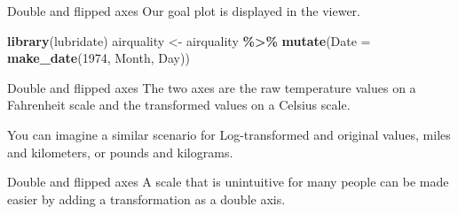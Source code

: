 \documentclass[
  ignorenonframetext,
]{beamer}
\newenvironment{Shaded}{\begin{snugshade}}{\end{snugshade}}
\newcommand{\AttributeTok}[1]{\textcolor[rgb]{0.13,0.29,0.53}{#1}}
\newcommand{\DecValTok}[1]{\textcolor[rgb]{0.00,0.00,0.81}{#1}}
\newcommand{\FunctionTok}[1]{\textcolor[rgb]{0.13,0.29,0.53}{\textbf{#1}}}
\newcommand{\NormalTok}[1]{#1}
\newcommand{\OtherTok}[1]{\textcolor[rgb]{0.56,0.35,0.01}{#1}}
\newcommand{\SpecialCharTok}[1]{\textcolor[rgb]{0.81,0.36,0.00}{\textbf{#1}}}
\begin{document}
\begin{frame}[fragile]{Double and flipped axes}
\label{double-and-flipped-axes-1}
Our goal plot is displayed in the viewer.


\begin{Shaded}
\begin{Highlighting}[]
\FunctionTok{library}\NormalTok{(lubridate)}
\NormalTok{airquality }\OtherTok{\textless{}{-}}\NormalTok{ airquality }\SpecialCharTok{\%\textgreater{}\%}
    \FunctionTok{mutate}\NormalTok{(}\AttributeTok{Date =} \FunctionTok{make\_date}\NormalTok{(}\DecValTok{1974}\NormalTok{, Month, Day))}
\end{Highlighting}
\end{Shaded}
\end{frame}

\begin{frame}{Double and flipped axes}
\label{double-and-flipped-axes-2}
The two axes are the raw temperature values on a Fahrenheit scale and
the transformed values on a Celsius scale.

You can imagine a similar scenario for Log-transformed and original
values, miles and kilometers, or pounds and kilograms.
\end{frame}

\begin{frame}{Double and flipped axes}
\label{double-and-flipped-axes-3}
A scale that is unintuitive for many people can be made easier by adding
a transformation as a double axis.
\end{frame}
\end{document}
